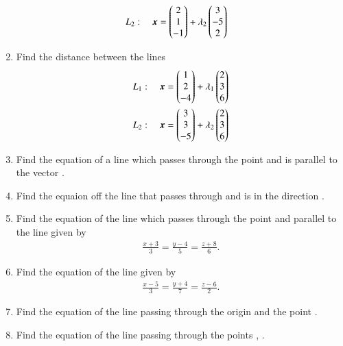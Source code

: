 \begin{enumerate}[label=\arabic*.,ref=\thesubsection.\theenumi]
\begin{align}
\\
L_2: \quad \bm{x} &= \begin{pmatrix}2\\1\\-1\end{pmatrix} + \lambda_2\begin{pmatrix}3 \\ -5 \\2\end{pmatrix}
\end{align}
\item Find the 
distance between the lines 
\begin{align}
L_1: \quad \bm{x} &= \begin{pmatrix}1\\2\\-4\end{pmatrix} + \lambda_1\begin{pmatrix}2 \\ 3 \\6\end{pmatrix}
\\
L_2: \quad \bm{x} &= \begin{pmatrix}3\\3\\-5\end{pmatrix} + \lambda_2\begin{pmatrix}2 \\ 3 \\6\end{pmatrix}
\end{align}
%
\item Find the equation of a line which passes through the point  and is parallel to the vector .
\item Find the equaion off the line that passes through  and is in the direction .
\item Find the equation of the line which passes through  the point  and parallel to the line given by 
\begin{align}
\frac{x+3}{3} = \frac{y-4}{5} = \frac{z+8}{6}. 
\end{align}
\item Find the equation of the line given by 
\begin{align}
\frac{x-5}{3} = \frac{y+4}{7} = \frac{z-6}{2}. 
\end{align}
\item Find the equation of the line passing through the origin and the point .
\item Find the equation of the line passing through the points , .

\end{enumerate}
